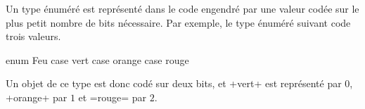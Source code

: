 
Un type énuméré est représenté dans le code engendré par une valeur codée sur le plus petit nombre de bits nécessaire. Par exemple, le type énuméré suivant code trois valeurs.
\begin{OMNIBUS}
enum Feu {
  case vert
  case orange
  case rouge
}
\end{OMNIBUS}

Un objet de ce type est donc codé sur deux bits, et \omnibus+vert+ est représenté par $0$, \omnibus+orange+ par $1$ et \omnibus=rouge= par $2$.

